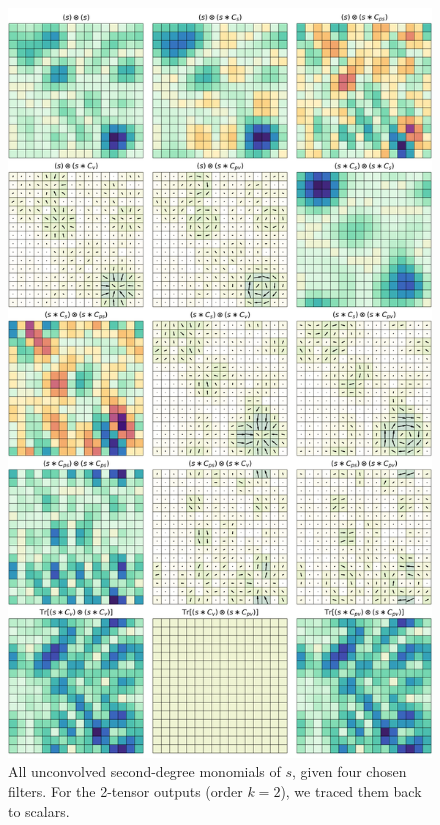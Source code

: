 \documentclass{article}
\theoremstyle{plain}
\begin{document}
\begin{figure}
  \begin{mdframed}
  \color{captiongray}
  \begin{center}
    \includegraphics[width=\textwidth]{notebooks/monomials_2.png}
  \end{center}
    \caption{All unconvolved second-degree monomials of $s$, given four chosen filters. For the 2-tensor outputs (order $k=2$), we traced them back to scalars.}
  \end{mdframed}
\end{figure}
\end{document}
